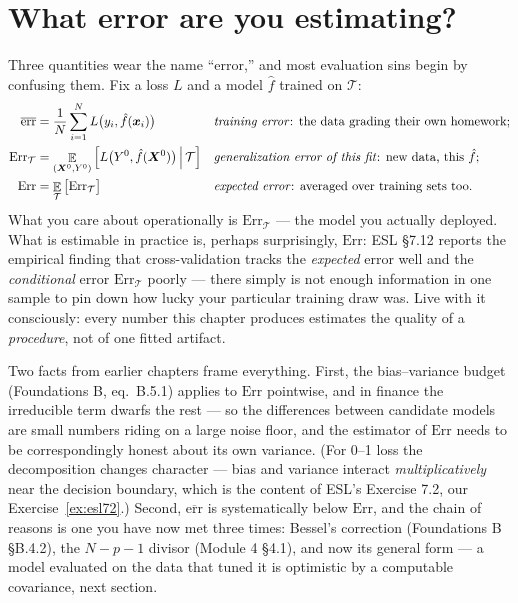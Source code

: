 \documentclass[11pt]{article}
\numberwithin{equation}{section}
\theoremstyle{plain}
\theoremstyle{definition}
\theoremstyle{remark}
\DeclareMathOperator{\E}{\mathbb{E}}
\newcommand{\x}{\bm{x}}
\newcommand{\Errr}{\mathrm{Err}}
\newcommand{\errbar}{\overline{\mathrm{err}}}
\begin{document}
\section{What error are you estimating?}\label{sec:err}

Three quantities wear the name ``error,'' and most evaluation sins begin by confusing them. Fix a loss $L$ and a model $\hat f$ trained on $\mathcal{T}$:
\begin{align}
\errbar &= \frac1N \sum_{i=1}^N L\big(y_i, \hat f(\x_i)\big)
&&\text{\emph{training error}: the data grading their own homework;}\\
\Errr_{\mathcal{T}} &= \E_{(\bm{X}^0, Y^0)}\Big[ L\big(Y^0, \hat f(\bm{X}^0)\big) \,\Big|\, \mathcal{T} \Big]
&&\text{\emph{generalization error of this fit}: new data, this $\hat f$;}\\
\Errr &= \E_{\mathcal{T}}\big[\Errr_{\mathcal{T}}\big]
&&\text{\emph{expected error}: averaged over training sets too.}
\end{align}
What you care about operationally is $\Errr_{\mathcal{T}}$ --- the model you actually deployed. What is estimable in practice is, perhaps surprisingly, $\Errr$: ESL \S7.12 reports the empirical finding that cross-validation tracks the \emph{expected} error well and the \emph{conditional} error $\Errr_{\mathcal{T}}$ poorly --- there simply is not enough information in one sample to pin down how lucky your particular training draw was. Live with it consciously: every number this chapter produces estimates the quality of a \emph{procedure}, not of one fitted artifact.

Two facts from earlier chapters frame everything. First, the bias--variance budget (Foundations B, eq.\ B.5.1) applies to $\Errr$ pointwise, and in finance the irreducible term dwarfs the rest --- so the differences between candidate models are small numbers riding on a large noise floor, and the estimator of $\Errr$ needs to be correspondingly honest about its own variance. (For 0--1 loss the decomposition changes character --- bias and variance interact \emph{multiplicatively} near the decision boundary, which is the content of ESL's Exercise 7.2, our Exercise~\ref{ex:esl72}.) Second, $\errbar$ is systematically below $\Errr$, and the chain of reasons is one you have now met three times: Bessel's correction (Foundations B \S B.4.2), the $N - p - 1$ divisor (Module 4 \S4.1), and now its general form --- a model evaluated on the data that tuned it is optimistic by a computable covariance, next section.
\end{document}
